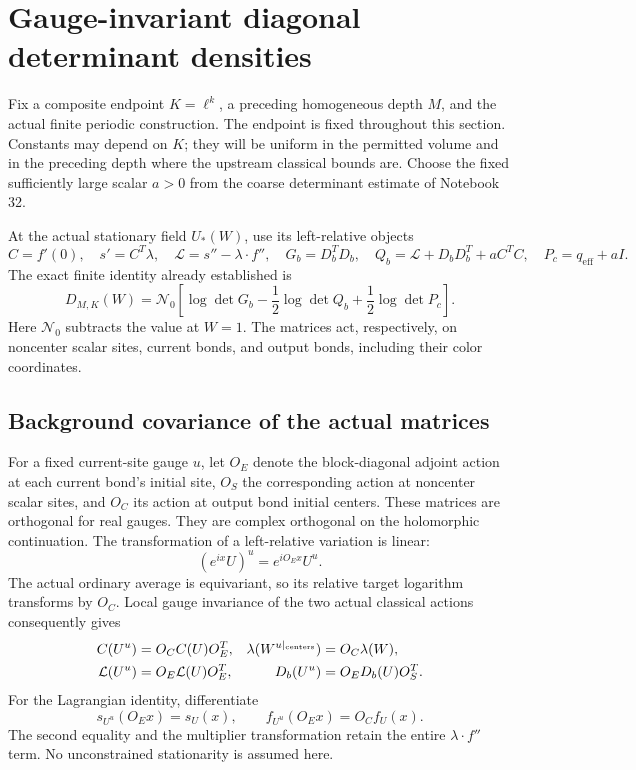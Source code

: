 \section{Gauge-invariant diagonal determinant densities}
\label{gdd-section}

Fix a composite endpoint \(K=\ell^k\), a preceding homogeneous
depth \(M\), and the actual finite periodic construction. The
endpoint is fixed throughout this section. Constants may depend
on \(K\); they will be uniform in the permitted volume and in
the preceding depth where the upstream classical bounds are.
Choose the fixed sufficiently large scalar \(a>0\) from the
coarse determinant estimate of Notebook 32.

At the actual stationary field \(U_*(W)\), use its left-relative
objects
\[
 C=f'(0),\quad s'=C^T\lambda,\quad
 \mathcal L=s''-\lambda\cdot f'',\quad
 G_b=D_b^TD_b,\quad
 Q_b=\mathcal L+D_bD_b^T+aC^TC,\quad
 P_c=q_{\mathrm{eff}}+aI.
\]
The exact finite identity already established is
\begin{equation}
 D_{M,K}(W)=\mathcal N_0\left[
       \log\det G_b-\frac12\log\det Q_b
                           +\frac12\log\det P_c\right].
 \label{gdd-exact-total}
\end{equation}
Here \(\mathcal N_0\) subtracts the value at \(W=1\).
The matrices act, respectively, on noncenter scalar sites,
current bonds, and output bonds, including their color coordinates.

\subsection{Background covariance of the actual matrices}
\label{gdd-covariance-section}

For a fixed current-site gauge \(u\), let \(O_E\) denote
the block-diagonal adjoint action at each current bond's
initial site, \(O_S\) the corresponding action at noncenter
scalar sites, and \(O_C\) its action at output bond initial
centers. These matrices are orthogonal for real gauges.
They are complex orthogonal on the holomorphic continuation.
The transformation of a left-relative variation is linear:
\[
 (e^{ix}U)^u=e^{iO_Ex}U^u.
\]
The actual ordinary average is equivariant, so its relative
target logarithm transforms by \(O_C\). Local gauge invariance
of the two actual classical actions consequently gives
\begin{align}
 C(U^u)&=O_C C(U)O_E^T,&
 \lambda(W^{u|_{\rm centers}})&=O_C\lambda(W),\notag\\
 \mathcal L(U^u)&=O_E\mathcal L(U)O_E^T,&
 D_b(U^u)&=O_E D_b(U)O_S^T. \label{gdd-transformations}
\end{align}
For the Lagrangian identity, differentiate
\[
 s_{U^u}(O_Ex)=s_U(x),\qquad
 f_{U^u}(O_Ex)=O_Cf_U(x).
\]
The second equality and the multiplier transformation retain
the entire \(\lambda\cdot f''\) term. No unconstrained
stationarity is assumed here.

